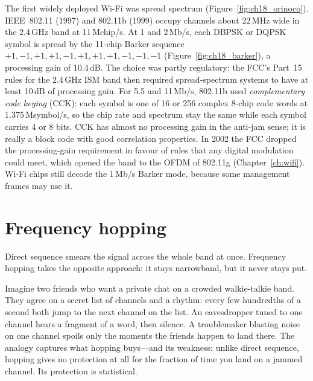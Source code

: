 \begin{inpractice}
The first widely deployed Wi-Fi was spread spectrum (Figure~\ref{fig:ch18_orinoco}).
IEEE~802.11 (1997) and 802.11b (1999) occupy channels about 22\,MHz wide in the 2.4\,GHz band at
11\,Mchip/s. At 1 and 2\,Mb/s, each DBPSK or DQPSK symbol is spread by the 11-chip Barker sequence
$+1,-1,+1,+1,-1,+1,+1,+1,-1,-1,-1$ (Figure~\ref{fig:ch18_barker}), a processing gain of 10.4\,dB.
The choice was partly regulatory: the FCC's Part~15 rules for the 2.4\,GHz ISM band then required
spread-spectrum systems to have at least 10\,dB of processing gain. For 5.5 and 11\,Mb/s, 802.11b
used \emph{complementary code keying} (CCK): each symbol is one of 16 or 256 complex 8-chip
code words at 1.375\,Msymbol/s, so the chip rate and spectrum stay the same while each
symbol carries 4 or 8 bits. CCK has almost no processing gain in the anti-jam sense; it is
really a block code with good correlation properties. In 2002 the FCC dropped the
processing-gain requirement in favour of rules that any digital modulation could meet,
which opened the band to the OFDM of 802.11g (Chapter~\ref{ch:wifi}). Wi-Fi chips still
decode the 1\,Mb/s Barker mode, because some management frames may use it.
\end{inpractice}


\section{Frequency hopping}
\label{sec:ch18:fhss}

Direct sequence smears the signal across the whole band at once. Frequency hopping takes the
opposite approach: it stays narrowband, but it never stays put.

\begin{analogy}
Imagine two friends who want a private chat on a crowded walkie-talkie band. They agree on a
secret list of channels and a rhythm: every few hundredths of a second both jump to the next
channel on the list. An eavesdropper tuned to one channel hears a fragment of a word, then
silence. A troublemaker blasting noise on one channel spoils only the moments the friends happen
to land there. The analogy captures what hopping buys---and its weakness: unlike direct
sequence, hopping gives no protection at all for the fraction of time you land on a jammed
channel. Its protection is statistical.
\end{analogy}


